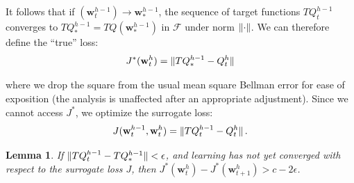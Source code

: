 \documentclass[letterpaper]{article} %
\newcommand{\val}{Q}
\newcommand{\valt}{\val}
\newcommand{\target}{Q}
\newcommand{\params}{\mathbf{w}}
\newcommand{\bellmanop}{T}
\newcommand{\smashednorm}[1]{\left\lVert \smash{#1} \right\rVert}
\newtheorem{lemma}{Lemma}
\begin{document}
It follows that if $(\params^{h-1}_t) \to \params^{h-1}_*$, the sequence of target functions $\bellmanop\valt^{h-1}_t$ converges to $\bellmanop\target^{h-1}_* = \bellmanop\valt(\params^{h-1}_*)$ in $\mathcal{F}$ under norm $\smashednorm{\cdot}$. We can therefore define the ``true'' loss:
\begin{equation}
    J^*(\params^h_t) = \smashednorm{\bellmanop\target^{h-1}_* - \valt^h_t}
\end{equation}

\noindent where we drop the square from the usual mean square Bellman error \cite{rlbook2018} for ease of exposition (the analysis is unaffected after an appropriate adjustment). Since we cannot access $J^*$, we optimize the surrogate loss:
\begin{equation}
    J(\params^{h-1}_t, \params^h_t) = \smashednorm{\bellmanop\valt^{h-1}_t - \valt^h_t}.
\end{equation}
\begin{lemma}\label{lemma_strict_progress}
    If $\smashednorm{\bellmanop\valt^{h-1}_t - \bellmanop\target^{h-1}_*} < \epsilon$,
    and learning has not yet converged with respect to the surrogate loss $J$, then $J^*(\params^h_t) -J^*(\params^h_{t+1}) > c - 2\epsilon$.
\end{lemma}
\end{document}
